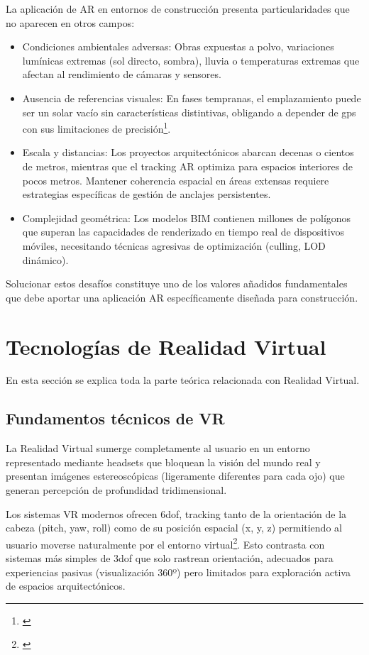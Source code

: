 La aplicación de AR en entornos de construcción presenta particularidades que no aparecen en otros campos:
\begin{itemize}

\item Condiciones ambientales adversas: Obras expuestas a polvo, variaciones lumínicas extremas (sol directo, sombra), lluvia o temperaturas extremas que afectan al rendimiento de cámaras y sensores.

\item Ausencia de referencias visuales: En fases tempranas, el emplazamiento puede ser un solar vacío sin características distintivas, obligando a depender de \gls{gps} con sus limitaciones de precisión\footnote{\cite{wang2013augmented}}.

\item Escala y distancias: Los proyectos arquitectónicos abarcan decenas o cientos de metros, mientras que el tracking AR optimiza para espacios interiores de pocos metros. Mantener coherencia espacial en áreas extensas requiere estrategias específicas de gestión de anclajes persistentes.

\item Complejidad geométrica: Los modelos BIM contienen millones de polígonos que superan las capacidades de renderizado en tiempo real de dispositivos móviles, necesitando técnicas agresivas de optimización (culling, LOD dinámico).
\end{itemize}
Solucionar estos desafíos constituye uno de los valores añadidos fundamentales que debe aportar una aplicación AR específicamente diseñada para construcción.


\section{Tecnologías de Realidad Virtual}
En esta sección se explica toda la parte teórica relacionada con Realidad Virtual.
\subsection{Fundamentos técnicos de VR}



La Realidad Virtual sumerge completamente al usuario en un entorno representado mediante headsets que bloquean la visión del mundo real y presentan imágenes estereoscópicas (ligeramente diferentes para cada ojo) que generan percepción de profundidad tridimensional.

Los sistemas VR modernos ofrecen \gls{6dof}, tracking tanto de la orientación de la cabeza (pitch, yaw, roll) como de su posición espacial (x, y, z) permitiendo al usuario moverse naturalmente por el entorno virtual\footnote{\cite{slater2009place}}. Esto contrasta con sistemas más simples de \gls{3dof} que solo rastrean orientación, adecuados para experiencias pasivas (visualización 360º) pero limitados para exploración activa de espacios arquitectónicos.

